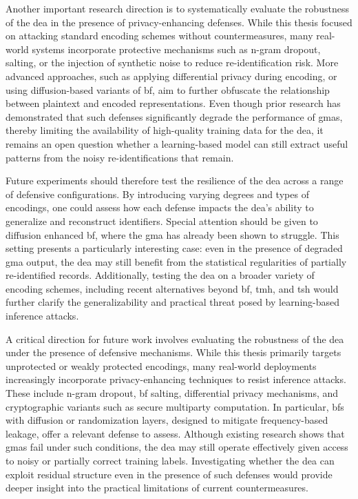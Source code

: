 Another important research direction is to systematically evaluate the robustness of the \ac{dea} in the presence of privacy-enhancing defenses.
While this thesis focused on attacking standard encoding schemes without countermeasures, many real-world systems incorporate protective mechanisms such as n-gram dropout, salting, or the injection of synthetic noise to reduce re-identification risk.
More advanced approaches, such as applying differential privacy during encoding, or using diffusion-based variants of \ac{bf}, aim to further obfuscate the relationship between plaintext and encoded representations.
Even though prior research has demonstrated that such defenses significantly degrade the performance of \ac{gma}s, thereby limiting the availability of high-quality training data for the \ac{dea}, it remains an open question whether a learning-based model can still extract useful patterns from the noisy re-identifications that remain.

Future experiments should therefore test the resilience of the \ac{dea} across a range of defensive configurations.
By introducing varying degrees and types of encodings, one could assess how each defense impacts the \ac{dea}’s ability to generalize and reconstruct identifiers.
Special attention should be given to diffusion enhanced \ac{bf}, where the \ac{gma} has already been shown to struggle.
This setting presents a particularly interesting case: even in the presence of degraded \ac{gma} output, the \ac{dea} may still benefit from the statistical regularities of partially re-identified records.
Additionally, testing the \ac{dea} on a broader variety of encoding schemes, including recent alternatives beyond \ac{bf}, \ac{tmh}, and \ac{tsh} would further clarify the generalizability and practical threat posed by learning-based inference attacks.

A critical direction for future work involves evaluating the robustness of the \ac{dea} under the presence of defensive mechanisms.
While this thesis primarily targets unprotected or weakly protected encodings, many real-world deployments increasingly incorporate privacy-enhancing techniques to resist inference attacks.
These include n-gram dropout, \ac{bf} salting, differential privacy mechanisms, and cryptographic variants such as secure multiparty computation.
In particular, \ac{bf}s with diffusion or randomization layers, designed to mitigate frequency-based leakage, offer a relevant defense to assess.
Although existing research shows that \ac{gma}s fail under such conditions, the \ac{dea} may still operate effectively given access to noisy or partially correct training labels.
Investigating whether the \ac{dea} can exploit residual structure even in the presence of such defenses would provide deeper insight into the practical limitations of current countermeasures.

